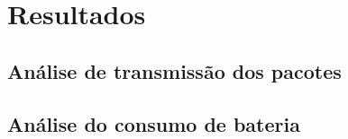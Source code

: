 \chapter{Resultados}
\label{cap:result}

\section{Análise de transmissão dos pacotes}
\label{result:transmissao}

\section{Análise do consumo de bateria}
\label{result:consumo}
